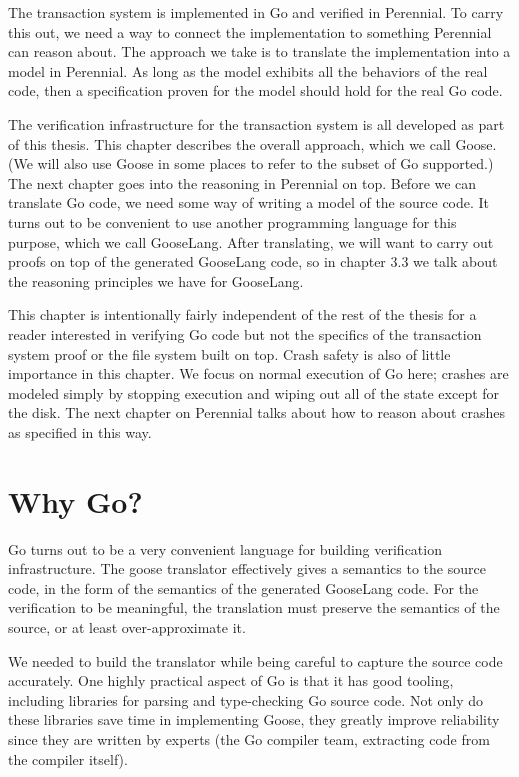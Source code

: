 The transaction system is implemented in Go and verified in Perennial.
To carry this out, we need a way to connect the implementation to
something Perennial can reason about. The approach we take is to
translate the implementation into a model in Perennial. As long as the
model exhibits all the behaviors of the real code, then a specification
proven for the model should hold for the real Go code.

The verification infrastructure for the transaction system is all
developed as part of this thesis. This chapter describes the overall
approach, which we call Goose. (We will also use Goose in some places to
refer to the subset of Go supported.) The next chapter goes into the
reasoning in Perennial on top. Before we can translate Go code, we need
some way of writing a model of the source code. It turns out to be
convenient to use another programming language for this purpose, which
we call GooseLang. After translating, we will want to carry out proofs
on top of the generated GooseLang code, so in chapter 3.3 we talk about
the reasoning principles we have for GooseLang.

This chapter is intentionally fairly independent of the rest of the
thesis for a reader interested in verifying Go code but not the
specifics of the transaction system proof or the file system built on
top. Crash safety is also of little importance in this chapter. We focus
on normal execution of Go here; crashes are modeled simply by stopping
execution and wiping out all of the state except for the disk. The next
chapter on Perennial talks about how to reason about crashes as
specified in this way.

\section{Why Go?}

Go turns out to be a very convenient language for building verification
infrastructure. The goose translator effectively gives a semantics to
the source code, in the form of the semantics of the generated GooseLang
code. For the verification to be meaningful, the translation must
preserve the semantics of the source, or at least over-approximate it.

We needed to build the translator while being careful to capture the
source code accurately. One highly practical aspect of Go is that it has
good tooling, including libraries for parsing and type-checking Go
source code. Not only do these libraries save time in implementing
Goose, they greatly improve reliability since they are written by
experts (the Go compiler team, extracting code from the compiler
itself).

